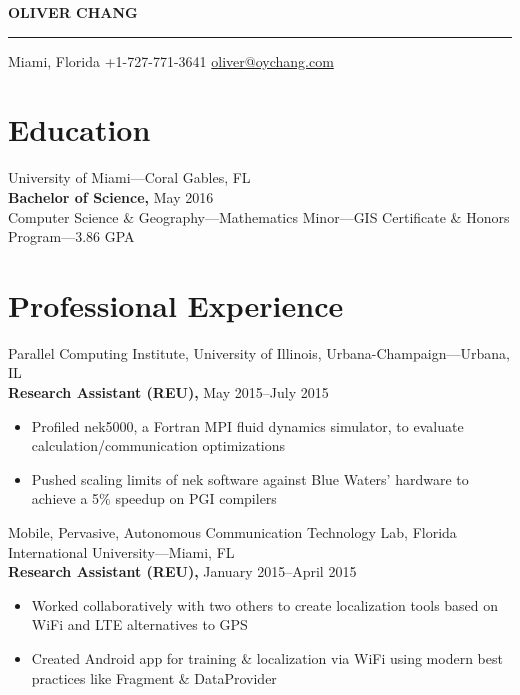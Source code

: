 \documentclass[letterpaper,12pt]{article}
\def\name{Oliver Chang}
\begin{document}
{\centering
  \Huge
    \textbf{\MakeUppercase{\name}}\\
}

\vskip 3mm
\hrule
\vskip 1mm

{\centering
  \normalsize
    \null\hfill%
      Miami, Florida \hfill
      +1-727-771-3641 \hfill
      \href{mailto:oliver@oychang.com}{oliver@oychang.com}
    \hfill\null\\
}

\section*{Education}
University of Miami---Coral Gables, FL\\
\textbf{Bachelor of Science,} May 2016\\
Computer Science \& Geography---Mathematics Minor---GIS Certificate \& Honors Program---3.86 GPA

\vskip 3.5mm

\section*{Professional Experience}

Parallel Computing Institute, University of Illinois, Urbana-Champaign---Urbana, IL\\
\textbf{Research Assistant (REU),} May 2015--July 2015
\begin{itemize}
  \item Profiled nek5000, a Fortran MPI fluid dynamics simulator, to evaluate calculation/communication optimizations
  \item Pushed scaling limits of nek software against Blue Waters' hardware to achieve a 5\% speedup on PGI compilers
\end{itemize}

\vskip 1.5mm

Mobile, Pervasive, Autonomous Communication Technology Lab, Florida International University---Miami, FL\\
\textbf{Research Assistant (REU),} January 2015--April 2015
\begin{itemize}
  \item Worked collaboratively with two others to create localization tools based on WiFi and LTE alternatives to GPS
  \item Created Android app for training \& localization via WiFi using modern best practices like Fragment \& DataProvider
\end{itemize}
\end{document}
